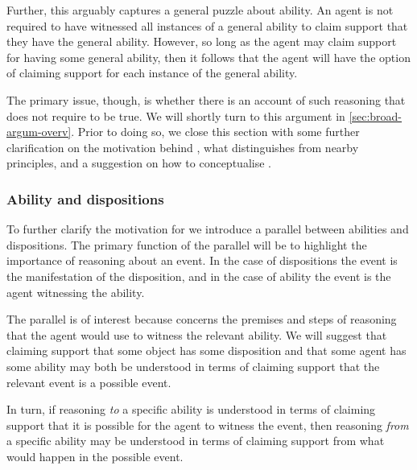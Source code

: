 \begin{note}
  Further, this arguably captures a general puzzle about ability.
  An agent is not required to have witnessed all instances of a general ability to claim support that they have the general ability.
  However, so long as the agent may claim support for having some general ability, then it follows that the agent will have the option of claiming support for each instance of the general ability.

  The primary issue, though, is whether there is an account of such reasoning that does not require \EAS{} to be true.
  We will shortly turn to this argument in \autoref{sec:broad-argum-overv}.
  Prior to doing so, we close this section with some further clarification on the motivation behind \EAS{}, what distinguishes \EAS{} from nearby principles, and a suggestion on how to conceptualise \EAS{}.
\end{note}

\subsubsection{Ability and dispositions}

\begin{note}[Parallel]
  To further clarify the motivation for \EAS{} we introduce a parallel between abilities and dispositions.
  The primary function of the parallel will be to highlight the importance of reasoning about an event.
  In the case of dispositions the event is the manifestation of the disposition, and in the case of ability the event is the agent witnessing the ability.

  The parallel is of interest because \EAS{} concerns the premises and steps of reasoning that the agent would use to witness the relevant ability.
  We will suggest that claiming support that some object has some disposition and that some agent has some ability may both be understood in terms of claiming support that the relevant event is a possible event.

  In turn, if reasoning \emph{to} a specific ability is understood in terms of claiming support that it is possible for the agent to witness the event, then reasoning \emph{from} a specific ability may be understood in terms of claiming support from what would happen in the possible event.
  \end{note}

